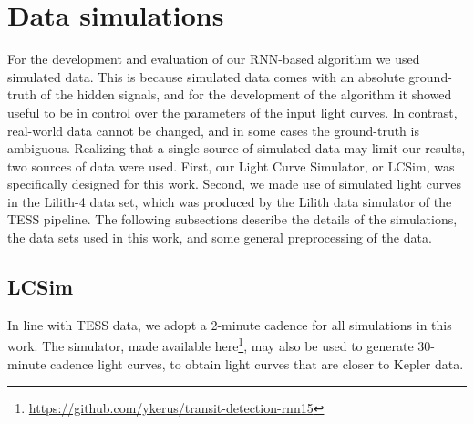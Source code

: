 
\section{Data simulations}

For the development and evaluation of our RNN-based algorithm we used simulated data. This is because simulated data comes with an absolute ground-truth of the hidden signals, and for the development of the algorithm it showed useful to be in control over the parameters of the input light curves. In contrast, real-world data cannot be changed, and in some cases the ground-truth is ambiguous. Realizing that a single source of simulated data may limit our results, two sources of data were used. First, our Light Curve Simulator, or LCSim, was specifically designed for this work. Second, we made use of simulated light curves in the Lilith-4 data set, which was produced by the Lilith data simulator of the TESS pipeline. The following subsections describe the details of the simulations, the data sets used in this work, and some general preprocessing of the data.

\subsection{LCSim}
\label{sec:lcsim}

In line with TESS data, we adopt a 2-minute cadence for all simulations in this work. The simulator, made available here\footnote{\url{https://github.com/ykerus/transit-detection-rnn15}}, may also be used to generate 30-minute cadence light curves, to obtain light curves that are closer to Kepler data. 

